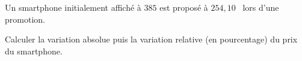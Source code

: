 \begin{exo}{}
	Un smartphone initialement affiché à $385$\eur{} est proposé à $254,10$~\eur{} lors d'une promotion.


	Calculer la variation absolue puis la variation relative (en pourcentage) du prix du smartphone.
\end{exo}
